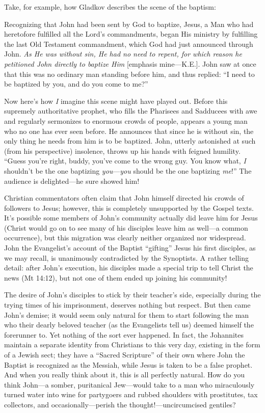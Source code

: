 Take, for example, how Gladkov describes the scene of the baptism:
\begin{smallquote}
    Recognizing that John had been sent by God to baptize, Jesus, a Man who had heretofore fulfilled all the Lord's commandments, began His ministry by fulfilling the last Old Testament commandment, which God had just announced through John. \emph{As He was without sin, He had no need to repent, for which reason he petitioned John directly to baptize Him} [emphasis mine---K.E.]. John saw at once that this was no ordinary man standing before him, and thus replied: ``I need to be baptized by you, and do you come to me?''
\end{smallquote}

Now here's how \emph{I} imagine this scene might have played out. Before this supremely authoritative prophet, who fills the Pharisees and Sadducees with awe and regularly sermonizes to enormous crowds of people, appears a young man who no one has ever seen before. He announces that since he is without sin, the only thing he needs from him is to be baptized. John, utterly astonished at such (from his perspective) insolence, throws up his hands with feigned humility. ``Guess you're right, buddy, you've come to the wrong guy. You know what, \emph{I} shouldn't be the one baptizing \emph{you}---\emph{you} should be the one baptizing \emph{me}!'' The audience is delighted---he sure showed him!

Christian commentators often claim that John himself directed his crowds of followers to Jesus; however, this is completely unsupported by the Gospel texts. It's possible some members of John's community actually did leave him for Jesus (Christ would go on to see many of his disciples leave him as well---a common occurrence), but this migration was clearly neither organized nor widespread. John the Evangelist's account of the Baptist ``gifting'' Jesus his first disciples, as we may recall, is unanimously contradicted by the Synoptists. A rather telling detail: after John's execution, his disciples made a special trip to tell Christ the news (Mt 14:12), but not one of them ended up joining his community!

The desire of John's disciples to stick by their teacher's side, especially during the trying times of his imprisonment, deserves nothing but respect. But then came John's demise; it would seem only natural for them to start following the man who their dearly beloved teacher (as the Evangelists tell us) deemed himself the forerunner to. Yet nothing of the sort ever happened. In fact, the Johannites maintain a separate identity from Christians to this very day, existing in the form of a Jewish sect; they have a ``Sacred Scripture'' of their own where John the Baptist is recognized as the Messiah, while Jesus is taken to be a false prophet. And when you really think about it, this is all perfectly natural. How do you think John---a somber, puritanical Jew---would take to a man who miraculously turned water into wine for partygoers and rubbed shoulders with prostitutes, tax collectors, and occasionally---perish the thought!---uncircumcised gentiles?

